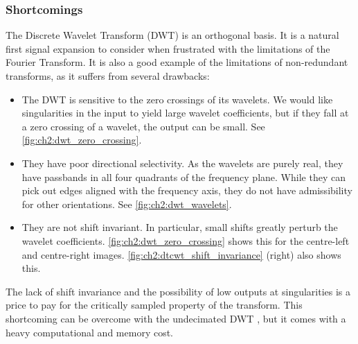   \subsubsection{Shortcomings}
  The Discrete Wavelet Transform (DWT) is an orthogonal basis. It is a natural
  first signal expansion to consider when frustrated with the limitations of the
  Fourier Transform. It is also a good example of the limitations of
  non-redundant transforms, as it suffers from several drawbacks:
  \begin{itemize}
    \item The DWT is sensitive to the zero crossings of its wavelets. We would
      like singularities in the input to yield large wavelet coefficients, but
      if they fall at a zero crossing of a wavelet, the output can be small. See
      \autoref{fig:ch2:dwt_zero_crossing}.
    \item They have poor directional selectivity. As the wavelets are purely
      real, they have passbands in all four quadrants of the frequency plane.
      While they can pick out edges aligned with the frequency axis, they do
      not have admissibility for other orientations. See
      \autoref{fig:ch2:dwt_wavelets}.
    \item They are not shift invariant. In particular, small shifts greatly
      perturb the wavelet coefficients. \autoref{fig:ch2:dwt_zero_crossing} shows
      this for the centre-left and centre-right images.
      \autoref{fig:ch2:dtcwt_shift_invariance} (right) also shows this.
  \end{itemize}

  The lack of shift invariance and the possibility of low outputs at
  singularities is a price to pay for the critically sampled property of the
  transform. This shortcoming can be overcome with the undecimated DWT
  \cite{mallat_wavelet_1998,coifman_translation-invariant_1995}, 
  but it comes with a heavy computational and memory cost.

